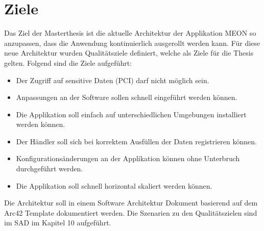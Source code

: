 \chapter{Ziele}

Das Ziel der Masterthesis ist die aktuelle Architektur der Applikation MEON so anzupassen, dass die Anwendung kontinuierlich ausgerollt werden kann. Für diese neue Architektur wurden Qualitätsziele definiert, welche als Ziele für die Thesis gelten. Folgend sind die Ziele aufgeführt:

\begin{itemize}
	\item Der Zugriff auf sensitive Daten (PCI) darf nicht möglich sein.
	\item Anpassungen an der Software sollen schnell eingeführt werden können.
	\item Die Applikation soll einfach auf unterschiedlichen Umgebungen installiert werden können.
	\item Der Händler soll sich bei korrektem Ausfüllen der Daten registrieren können.
	\item Konfigurationsänderungen an der Applikation können ohne Unterbruch durchgeführt werden.
	\item Die Applikation soll schnell horizontal skaliert werden können.
\end{itemize}
Die Architektur soll in einem Software Architektur Dokument basierend auf dem Arc42 Template dokumentiert werden. Die Szenarien zu den Qualitätszielen sind im SAD im Kapitel 10 aufgeführt.
